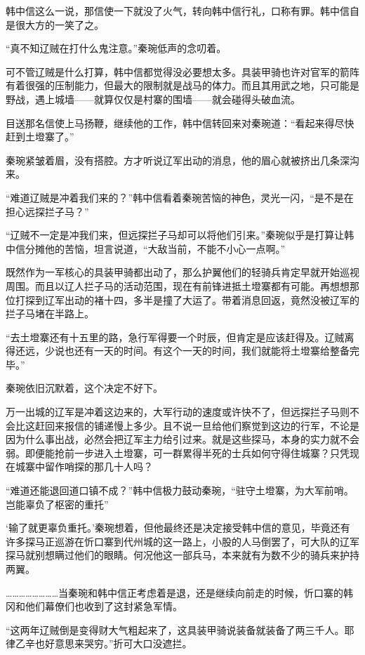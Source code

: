 韩中信这么一说，那信使一下就没了火气，转向韩中信行礼，口称有罪。韩中信自是很大方的一笑了之。

“真不知辽贼在打什么鬼注意。”秦琬低声的念叨着。

可不管辽贼是什么打算，韩中信都觉得没必要想太多。具装甲骑也许对官军的箭阵有着很强的压制能力，但最大的限制就是战马的体力。而且其用武之地，只可能是野战，遇上城墙——就算仅仅是村寨的围墙——就会碰得头破血流。

目送那名信使上马扬鞭，继续他的工作，韩中信转回来对秦琬道：“看起来得尽快赶到土墱寨了。”

秦琬紧皱着眉，没有搭腔。方才听说辽军出动的消息，他的眉心就被挤出几条深沟来。

“难道辽贼是冲着我们来的？”韩中信看着秦琬苦恼的神色，灵光一闪，“是不是在担心远探拦子马？”

“辽贼不一定是冲我们来，但远探拦子马却可以将他们引来。”秦琬似乎是打算让韩中信分摊他的苦恼，坦言说道，“大敌当前，不能不小心一点啊。”

既然作为一军核心的具装甲骑都出动了，那么护翼他们的轻骑兵肯定早就开始巡视周围。而且以辽人拦子马的活动范围，现在有前锋进抵土墱寨都有可能。再想想那位打探到辽军出动的褚十四，多半是撞了大运了。带着消息回返，竟然没被辽军的拦子马堵在半路上。

“去土墱寨还有十五里的路，急行军得要一个时辰，但肯定是应该赶得及。辽贼离得还远，少说也还有一天的时间。有这个一天的时间，我们就能将土墱寨给整备完毕。”

秦琬依旧沉默着，这个决定不好下。

万一出城的辽军是冲着这边来的，大军行动的速度或许快不了，但远探拦子马则不会比这赶回来报信的铺递慢上多少。且不说一旦给他们察觉到这边的行军，不论是因为什么事出战，必然会把辽军主力给引过来。就是这些探马，本身的实力就不会弱。即便能抢前一步进入土墱寨，可一群累得半死的士兵如何守得住城寨？只凭现在城寨中留作哨探的那几十人吗？

“难道还能退回道口镇不成？”韩中信极力鼓动秦琬，“驻守土墱寨，为大军前哨。岂能辜负了枢密的重托”

‘输了就更辜负重托。’秦琬想着，但他最终还是决定接受韩中信的意见，毕竟还有许多探马正巡游在忻口寨到代州城的这一路上，小股的人马倒罢了，可大队的辽军探马就别想瞒过他们的眼睛。何况他这一部兵马，本来就有为数不少的骑兵来护持两翼。

……………………当秦琬和韩中信正考虑着是退，还是继续向前走的时候，忻口寨的韩冈和他们幕僚们也收到了这封紧急军情。

“这两年辽贼倒是变得财大气粗起来了，这具装甲骑说装备就装备了两三千人。耶律乙辛也好意思来哭穷。”折可大口没遮拦。


